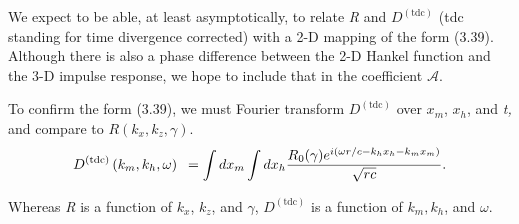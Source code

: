 We expect to be able, at least asymptotically, to relate \textit{R} and \(D^{(\text{{tdc}})}\) (tdc standing for time divergence corrected) with a 2-D mapping of the form (3.39). Although
there is also a phase difference between the 2-D Hankel function and the 3-D impulse response, we hope to include that in the coefficient $\mathcal{A}$.

To confirm the form (3.39), we must Fourier transform \(D^{(\text{{tdc}})}\) over \(x_m\), \(x_h\), and \textit{t, }and compare to \(R\left(k_x,k_z,\gamma
\right)\).
\begin{equation}\text{\textit{$D$}}^{(\text{{tdc}})}\left(\text{\textit{$k_m$}},\text{\textit{$k_h$}},\omega \right)\text{  }= \int d\text{\textit{$x_m$}}\int
d\text{\textit{$x_h$}}\frac{\text{\textit{$R$}}_0(\gamma ) e^{i \left(\omega  \text{\textit{$r/c$}}\text{\textit{$-$}}\text{\textit{$k_hx_h$}}\text{\textit{$-$}}\text{\textit{$\text{\textit{$k$}}_mx_m$}}\right)}}{\text{\textit{$\sqrt{\text{\textit{$r$}}
c}$}}}.\end{equation}

Whereas \textit{R} is a function of \(k_x\), \(k_z\), and $\gamma $, \(D^{(\text{{tdc}})}\) is a function of \(k_m, k_h\), and $\omega $.

